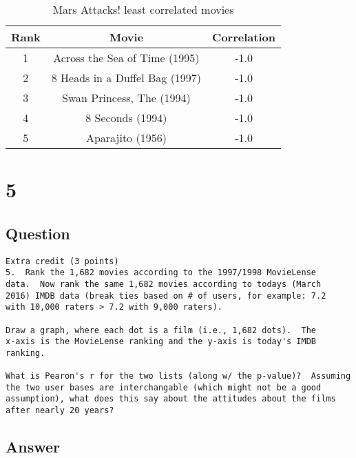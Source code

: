 \documentclass[letterpaper,11pt]{article}
\begin{document}
\begin{table}[htb]
\centering
\begin{tabular}{ | c | c | c |}
\hline
\textbf{Rank} & \textbf{Movie} & \textbf{Correlation} \\
\hline
1 & Across the Sea of Time (1995) & -1.0 \\
\hline
2 & 8 Heads in a Duffel Bag (1997) & -1.0 \\
\hline
3 & Swan Princess, The (1994) & -1.0 \\ 
\hline
4 & 8 Seconds (1994) & -1.0 \\
\hline
5 & Aparajito (1956) & -1.0 \\
\hline
\end{tabular}
\caption{Mars Attacks! least correlated movies}
\label{table:q4least2}
\end{table}

\clearpage


\section*{5}

\subsection*{Question}

\begin{verbatim}
Extra credit (3 points)
5.  Rank the 1,682 movies according to the 1997/1998 MovieLense
data.  Now rank the same 1,682 movies according to todays (March
2016) IMDB data (break ties based on # of users, for example: 7.2
with 10,000 raters > 7.2 with 9,000 raters).

Draw a graph, where each dot is a film (i.e., 1,682 dots).  The
x-axis is the MovieLense ranking and the y-axis is today's IMDB
ranking.

What is Pearon's r for the two lists (along w/ the p-value)?  Assuming
the two user bases are interchangable (which might not be a good
assumption), what does this say about the attitudes about the films
after nearly 20 years?
\end{verbatim}

\subsection*{Answer}
\end{document}
